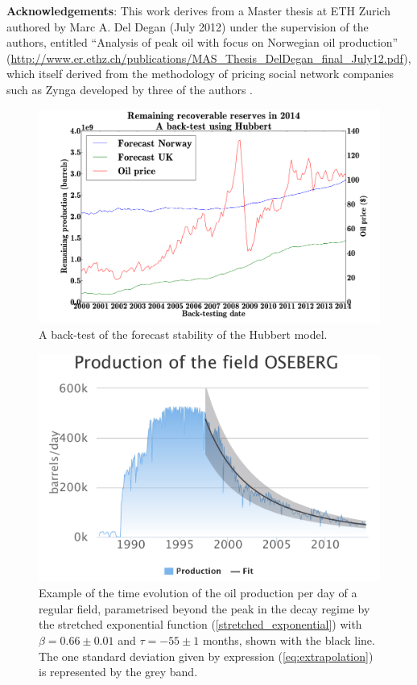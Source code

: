 \documentclass[review]{elsarticle}
\begin{document}
\vskip 0.5cm
\noindent
{\bf Acknowledgements}: This work derives from a Master thesis at ETH Zurich authored by 
Marc A. Del Degan (July 2012) under the supervision of the authors, 
entitled ``Analysis of peak oil with focus on Norwegian oil production''
(\url{http://www.er.ethz.ch/publications/MAS_Thesis_DelDegan_final_July12.pdf}), which
itself derived from the methodology of pricing social network companies such as Zynga developed
by three of the authors \cite{Forro2012}.






\newpage{}

\noindent 
\begin{figure}[H]
\includegraphics[width=1\columnwidth]{hubbert-backtest}
\caption{A back-test of the forecast stability of the Hubbert model.}
\label{hubbert-backtest} 
\end{figure}

\pagebreak

\noindent 
\begin{figure}[H]
\includegraphics[width=1\columnwidth]{oseberg}
\caption{Example of the time evolution of the oil production per day of
a regular field, parametrised beyond the peak in the decay
regime by the stretched exponential 
function (\ref{stretched_exponential}) with $\beta=0.66\pm0.01$ and $\tau=-55\pm1$ months,
shown with the black line.  The one standard deviation given by expression
(\ref{eq:extrapolation}) is represented by the grey band.}
\label{regular} 
\end{figure}
\end{document}
